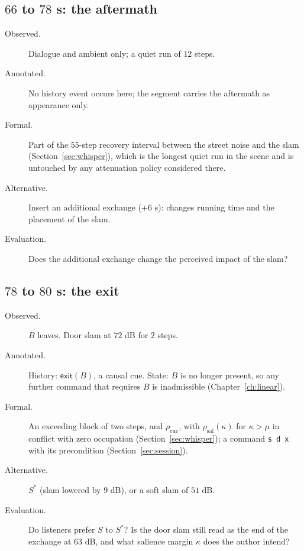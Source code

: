 \subsection*{$66$ to $78$ s: the aftermath}
\begin{description}
\item[Observed.] Dialogue and ambient only; a quiet run of $12$ steps.
\item[Annotated.] No history event occurs here; the segment carries the aftermath as appearance only.
\item[Formal.] Part of the $55$-step recovery interval between the street noise and the slam (Section~\ref{sec:whisper}), which is the longest quiet run in the scene and is untouched by any attenuation policy considered there.
\item[Alternative.] Insert an additional exchange ($+6$ s): changes running time and the placement of the slam.
\item[Evaluation.] Does the additional exchange change the perceived impact of the slam?
\end{description}

\subsection*{$78$ to $80$ s: the exit}
\begin{description}
\item[Observed.] $B$ leaves. Door slam at $72$ dB for $2$ steps.
\item[Annotated.] History: $\mathsf{exit}(B)$, a causal cue. State: $B$ is no longer present, so any further command that requires $B$ is inadmissible (Chapter~\ref{ch:linear}).
\item[Formal.] An exceeding block of two steps, and $\rho_{\mathrm{cue}}$, with $\rho_{\mathrm{sal}}(\kappa)$ for $\kappa>\mu$ in conflict with zero occupation (Section~\ref{sec:whisper}); a command \texttt{s d x} with its precondition (Section~\ref{sec:session}).
\item[Alternative.] $S^*$ (slam lowered by $9$ dB), or a soft slam of $51$ dB.
\item[Evaluation.] Do listeners prefer $S$ to $S^*$? Is the door slam still read as the end of the exchange at $63$ dB, and what salience margin $\kappa$ does the author intend?
\end{description}

